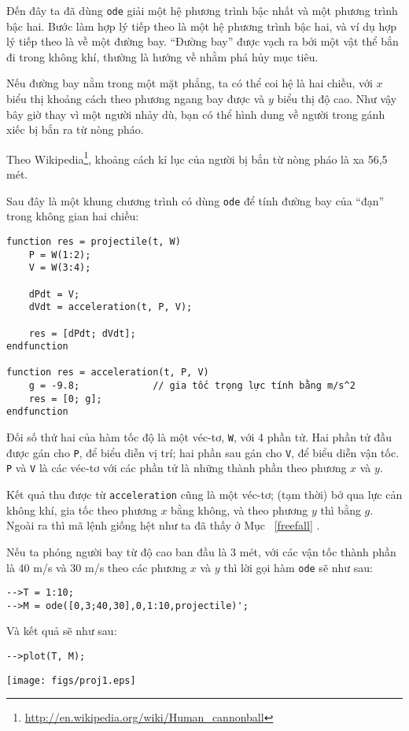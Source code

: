 \documentclass[12pt]{book}
\begin{document}
Đến đây ta đã dùng {\tt ode} giải một hệ phương trình bậc nhất
và một phương trình bậc hai. Bước làm hợp lý tiếp theo là một 
hệ phương trình bậc hai, và ví dụ hợp lý tiếp theo là về một đường bay.
``Đường bay'' được vạch ra bởi một vật thể bắn đi trong không khí,
thường là hướng về nhằm phá hủy mục tiêu.

Nếu đường bay nằm trong một mặt phẳng, ta có thể coi hệ là
hai chiều, với $x$ biểu thị khoảng cách theo phương ngang bay được
và $y$ biểu thị độ cao. Như vậy bây giờ thay vì một người nhảy dù,
bạn có thể hình dung về người trong gánh xiếc bị bắn ra từ nòng pháo.

Theo Wikipedia\footnote{\url{http://en.wikipedia.org/wiki/Human_cannonball}},
khoảng cách kỉ lục của người bị bắn từ nòng pháo là xa 56,5 mét.

Sau đây là một khung chương trình có dùng {\tt ode} để tính đường bay của ``đạn'' trong
không gian hai chiều:

\begin{verbatim}
function res = projectile(t, W)
    P = W(1:2);
    V = W(3:4);

    dPdt = V;                          
    dVdt = acceleration(t, P, V);

    res = [dPdt; dVdt];
endfunction

function res = acceleration(t, P, V)
    g = -9.8;             // gia tốc trọng lực tính bằng m/s^2
    res = [0; g];
endfunction
\end{verbatim}
%
Đối số thứ hai của hàm tốc độ là một véc-tơ, {\tt W}, với
4 phần tử. Hai phần tử đầu được gán cho {\tt P}, để biểu
diễn vị trí; hai phần sau gán cho {\tt V}, để biểu diễn
vận tốc. {\tt P} và {\tt V} là các véc-tơ với các phần tử
là những thành phần theo phương $x$ và $y$.

Kết quả thu được từ {\tt acceleration} cũng là một véc-tơ; 
(tạm thời) bở qua lực cản không khí, gia tốc theo phương
$x$ bằng không, và theo phương $y$ thì bằng $g$. 
Ngoài ra thì mã lệnh giống hệt như ta đã thấy ở
Mục~ \ref{freefall} .

Nếu ta phóng người bay từ độ cao ban đầu là 3 mét, với các
vận tốc thành phần là 40 m/s và 30 m/s theo các phương $x$ 
và $y$ thì lời gọi hàm {\tt ode} sẽ như sau:

\begin{verbatim}
-->T = 1:10;
-->M = ode([0,3;40,30],0,1:10,projectile)';
\end{verbatim}
%
Và kết quả sẽ như sau:

\begin{verbatim}
-->plot(T, M);
\end{verbatim}
\centerline{\texttt{[image: figs/proj1.eps]}}
\end{document}
